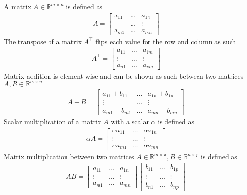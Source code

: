 A matrix $A \in \mathbb{R}^{m \times n}$ is defined as 
\begin{align}
  A = 
  \begin{bmatrix}
     a_{11} & \dots & a_{1n} \\
    \vdots & \dots & \vdots \\
    a_{m1} & \dots & a_{mn}
  \end{bmatrix}
\end{align}
The transpose of a matrix $A^\top$ flips each value for the row and column  as such 
\begin{align}
  A^\top = 
  \begin{bmatrix}
     a_{11} & \dots & a_{1m} \\
    \vdots & \dots & \vdots \\
    a_{n1} & \dots & a_{nm}
  \end{bmatrix}
\end{align}
Matrix addition is element-wise and can be shown as such between two matrices $A,B \in \mathbb{R}^{m \times n}$
\begin{align}
  A + B = 
  \begin{bmatrix}
    a_{11} + b_{11} & \dots & a_{1n} + b_{1n} \\
    \vdots & \dots & \vdots \\
    a_{m1} + b_{m1} & \dots & a_{mn} + b_{mn}
  \end{bmatrix}
\end{align}
Scalar multiplication of a matrix $A$ with a scalar $\alpha$ is defined as 
\begin{align}
  \alpha A = 
  \begin{bmatrix}
     \alpha a_{11} & \dots & \alpha a_{1n} \\
    \vdots & \dots & \vdots \\
    \alpha a_{m1} & \dots & \alpha a_{mn}
  \end{bmatrix}
\end{align}
Matrix multiplication between two matrices $A \in \mathbb{R}^{m \times n}, B \in \mathbb{R}^{n \times p}$ is defined as 
\begin{align}
  AB = 
  \begin{bmatrix}
    a_{11} & \dots & a_{1n} \\
   \vdots & \dots & \vdots \\
   a_{m1} & \dots & a_{mn}
 \end{bmatrix}
 \begin{bmatrix}
  b_{11} & \dots & b_{1p} \\
 \vdots & \dots & \vdots \\
 b_{n1} & \dots & b_{np}
\end{bmatrix}
\end{align}
